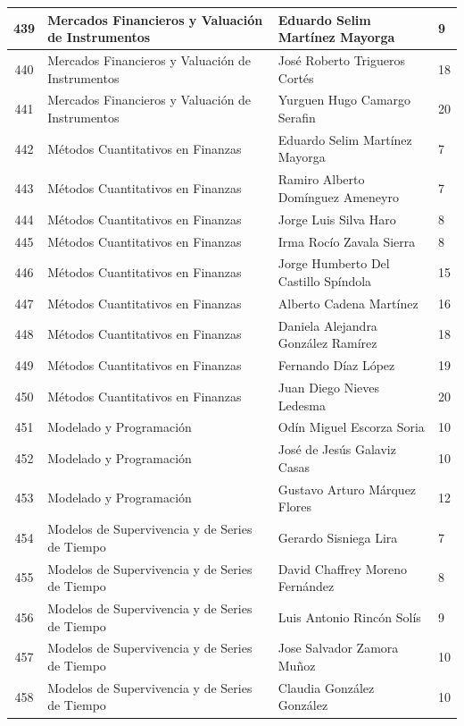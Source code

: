 {\begin{longtable}{|c|p{6.5cm}|p{5cm}|p{1.5cm}|}
  439 & Mercados Financieros y Valuación de Instrumentos & Eduardo Selim Martínez Mayorga & 9 \\ \hline
  440 & Mercados Financieros y Valuación de Instrumentos & José Roberto Trigueros Cortés & 18 \\ \hline
  441 & Mercados Financieros y Valuación de Instrumentos & Yurguen Hugo Camargo Serafin & 20 \\ \hline
  442 & Métodos Cuantitativos en Finanzas & Eduardo Selim Martínez Mayorga & 7 \\ \hline
  443 & Métodos Cuantitativos en Finanzas & Ramiro Alberto Domínguez Ameneyro & 7 \\ \hline
  444 & Métodos Cuantitativos en Finanzas & Jorge Luis Silva Haro & 8 \\ \hline
  445 & Métodos Cuantitativos en Finanzas & Irma Rocío Zavala Sierra & 8 \\ \hline
  446 & Métodos Cuantitativos en Finanzas & Jorge Humberto Del Castillo Spíndola & 15 \\ \hline
  447 & Métodos Cuantitativos en Finanzas & Alberto Cadena Martínez & 16 \\ \hline
  448 & Métodos Cuantitativos en Finanzas & Daniela Alejandra González Ramírez & 18 \\ \hline
  449 & Métodos Cuantitativos en Finanzas & Fernando Díaz López & 19 \\ \hline
  450 & Métodos Cuantitativos en Finanzas & Juan Diego Nieves Ledesma & 20 \\ \hline
  451 & Modelado y Programación & Odín Miguel Escorza Soria & 10 \\ \hline
  452 & Modelado y Programación & José de Jesús Galaviz Casas & 10 \\ \hline
  453 & Modelado y Programación & Gustavo Arturo Márquez Flores & 12 \\ \hline
  454 & Modelos de Supervivencia y de Series de Tiempo & Gerardo Sisniega Lira & 7 \\ \hline
  455 & Modelos de Supervivencia y de Series de Tiempo & David Chaffrey Moreno Fernández & 8 \\ \hline
  456 & Modelos de Supervivencia y de Series de Tiempo & Luis Antonio Rincón Solís & 9 \\ \hline
  457 & Modelos de Supervivencia y de Series de Tiempo & Jose Salvador Zamora Muñoz & 10 \\ \hline
  458 & Modelos de Supervivencia y de Series de Tiempo & Claudia González González & 10 \\ \hline

\end{longtable}}
